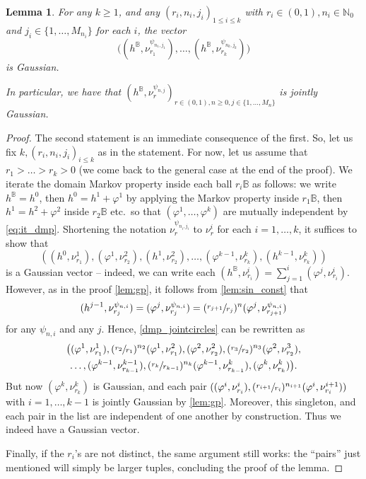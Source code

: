 \documentclass[JEP,XML,SOM,Unicode,published]{cedram}
\newtheorem{lemma}[theorem]{Lemma}
\theoremstyle{definition}
\newcommand{\N}{\mathbb{N}}
\newcommand{\B}{\mathbb{B}}\let\D\B\let\Ub\B
\begin{document}
\begin{lemma}
For any $k \geq 1$, and any $(r_i,n_i,j_i)_{1\le i \le k}$ with $r_i\in (0,1), n_i\in \N_0$ and $j_i\in \{1,\dots, M_{n_i}\}$ for each $i$, the vector\vspace*{-3pt}
\[
\bigl((h^\B, \nu^{\psi_{n_1,j_1}}_{r_1}),\dots, (h^\B, \nu^{\psi_{n_k,j_k}}_{r_k})\bigr)
\]
is Gaussian.

In particular, we have that $(h^\B, \nu^{\psi_{n,j}}_r)_{r \in (0,1), n \geq 0, j \in \{1, \dots, M_n\}}$ is jointly Gaussian.
\end{lemma}

\begin{proof}
The second statement is an immediate consequence of the first. So, let us fix $k,(r_i,n_i,j_i)_{i\le k}$ as in the statement.
For now, let us assume that $r_1>\dots>r_k>0$ (we come back to the general case at the end of the proof). We iterate the domain Markov property inside each ball $r_i\B$ as follows: we write $h^\B=h^0$, then $h^0=h^1+\varphi^1$ by applying the Markov property inside $r_1\B$, then $h^1=h^2+\varphi^2$ inside $r_2\B$ etc.\ so that $(\varphi^1,\dots, \varphi^k)$ are mutually independent by \eqref{eq:it_dmp}. Shortening the notation $\nu_r^{\psi_{n_i,j_i}}$ to $\nu_r^i$ for each $i=1,\dots, k$, it suffices to show that
\begin{equation}\label{dmp_jointcircles}\left((h^0,\nu_{r_1}^1),(\varphi^1,\nu_{r_2}^2),(h^1,\nu_{r_2}^2),\dots, (\varphi^{k-1},\nu_{r_k}^k),(h^{k-1},\nu_{r_k}^k)\right)\end{equation} is a Gaussian vector -- indeed, we can write each $(h^\B, \nu_{r_i}^i) = \sum_{j =1}^i (\varphi^j, \nu_{r_i}^i)$. {However, as in the proof \cref{lem:gp}, it follows from \cref{lem:sin_const}}
that\vspace*{-3pt}
\[
(h^{j-1},\nu_{r_j}^{\psi_{n,i}})=(\varphi^j,\nu_{r_j}^{\psi_{n,i}})=(\sfrac{r_{j+1}}{r_j})^{n}(\varphi^j,\nu_{r_{j+1}}^{\psi_{n,i}})
\]
for any $\psi_{n,i}$ and any $j$.
Hence, \eqref{dmp_jointcircles} can be rewritten as\vspace*{-3pt}
\begin{multline*}
\big((\varphi^1,\nu_{r_1}^1),(\sfrac{r_2}{r_1})^{n_2}(\varphi^1,\nu_{r_1}^2),(\varphi^2,\nu_{r_2}^2),(\sfrac{r_3}{r_2})^{n_3}(\varphi^2,\nu_{r_2}^3),\\
\dots,
(\varphi^{k-1},\nu_{r_{k-1}}^{k-1}),(\sfrac{r_k}{r_{k-1}})^{n_k}(\varphi^{k-1},\nu_{r_{k-1}}^k),(\varphi^k,\nu_{r_k}^k)\big).
\end{multline*}
{But now $(\varphi^k,\nu_{r_k}^k)$ is Gaussian, and each pair $((\varphi^i,\nu_{r_i}^i),(\sfrac{r_{i+1}}{r_i})^{n_{i+1}}(\varphi^i,\nu_{r_i}^{i+1}))$ with $i = 1, \dots, k -1$ is jointly Gaussian by \cref{lem:gp}. Moreover, this singleton, and each pair in the list are independent of one another by construction.} Thus we indeed have a Gaussian vector.

Finally, if the $r_i$'s are not distinct, the same argument still works: the ``pairs'' just mentioned will simply be larger tuples, concluding the proof of the lemma.
\end{proof}
\end{document}
